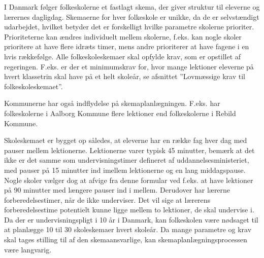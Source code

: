 I Danmark følger folkeskolerne et fastlagt skema, der giver struktur til eleverne og lærernes dagligdag. Skemaerne for hver folkeskole er unikke, da de er selvstændigt udarbejdet, hvilket betyder det er forskelligt hvilke parametre skolerne prioriter. Prioriteterne kan ændres individuelt mellem skolerne, f.eks. kan nogle skoler prioritere at have flere idræts timer, mens andre prioriterer at have fagene i en hvis rækkefølge. Alle folkeskoleskemaer skal opfylde krav, som er opstillet af regeringen. F.eks. er der et minimumskrav for, hvor mange lektioner eleverne på hvert klassetrin skal have på et helt skoleår, se afsnittet ”Lovmæssige krav til folkeskoleskemaet”.

Kommunerne har også indflydelse på skemaplanlægningen. F.eks. har folkeskolerne i Aalborg Kommune flere lektioner end folkeskolerne i Rebild Kommune.

Skoleskemaet er bygget op således, at eleverne har en række fag hver dag med pauser mellem lektionerne. Lektionerne varer typisk 45 minutter, bemærk at det ikke er det samme som undervisningstimer defineret af uddannelsesministeriet, med pauser på 15 minutter ind imellem lektionerne og en lang middagspause. Nogle skoler vælger dog at afvige fra denne formular ved f.eks. at have lektioner på 90 minutter med længere pauser ind i mellem. Derudover har lærerne forberedelsestimer, når de ikke underviser. Det vil sige at  lærerens forberedelsestime potentielt kunne ligge mellem to lektioner, de skal undervise i. Da der er undervisningspligt i 10 år i Danmark, kan folkeskolen være nødsaget til at planlægge 10 til 30 skoleskemaer hvert skoleår. Da mange parametre og krav skal tages stilling til af den skemaansvarlige, kan skemaplanlægningsprocessen være langvarig.